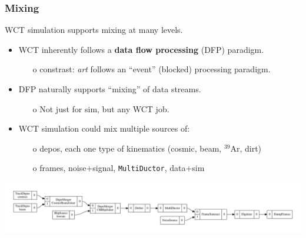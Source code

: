\documentclass[xcolor=dvipsnames]{beamer}
\begin{document}
\begin{frame}
  \frametitle{Mixing}
  WCT simulation supports mixing at many levels.
  \begin{itemize}\footnotesize
  \item WCT inherently follows a \textbf{data flow processing} (DFP) paradigm.
    \begin{itemize}\scriptsize
    \item[o] constrast: \textit{art} follows an ``event'' (blocked) processing paradigm.
    \end{itemize}
  \item DFP naturally supports ``mixing'' of data streams.
    \begin{itemize}\scriptsize
    \item[o] Not just for sim, but any WCT job.
    \end{itemize}
  \item WCT simulation could mix multiple sources of:
    \begin{itemize}\scriptsize
    \item[o] depos, each one type of kinematics (cosmic, beam, $^{39}$Ar, dirt)
    \item[o] frames, noise+signal, \texttt{MultiDuctor}, data+sim
    \end{itemize}
  \end{itemize}

  \includegraphics[width=\textwidth]{mixing.pdf}
\end{frame}
\end{document}
